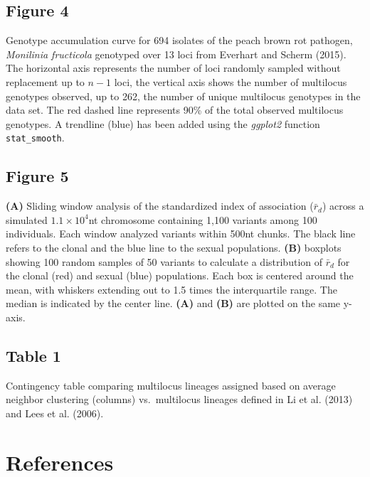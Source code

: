 \documentclass{frontiersSCNS} %
\begin{document}
\subsection*{Figure 4}\label{figure-4-1}

Genotype accumulation curve for 694 isolates of the peach brown rot
pathogen, \emph{Monilinia fructicola} genotyped over 13 loci from
Everhart and Scherm (2015). The horizontal axis represents the number of
loci randomly sampled without replacement up to \(n - 1\) loci, the
vertical axis shows the number of multilocus genotypes observed, up to
262, the number of unique multilocus genotypes in the data set. The red
dashed line represents 90\% of the total observed multilocus genotypes.
A trendline (blue) has been added using the \emph{ggplot2} function
\texttt{stat\_smooth}.

\subsection*{Figure 5}\label{figure-5-1}

\textbf{(A)} Sliding window analysis of the standardized index of
association (\(\bar{r}_d\)) across a simulated \(1.1 \times 10^4\)nt
chromosome containing 1,100 variants among 100 individuals. Each window
analyzed variants within 500nt chunks. The black line refers to the
clonal and the blue line to the sexual populations. \textbf{(B)}
boxplots showing 100 random samples of 50 variants to calculate a
distribution of \(\bar{r}_d\) for the clonal (red) and sexual (blue)
populations. Each box is centered around the mean, with whiskers
extending out to 1.5 times the interquartile range. The median is
indicated by the center line. \textbf{(A)} and \textbf{(B)} are plotted
on the same y-axis.

\subsection*{Table 1}\label{table-1-1}

Contingency table comparing multilocus lineages assigned based on
average neighbor clustering (columns) vs.~multilocus lineages defined in
Li et al. (2013) and Lees et al. (2006).

\section*{References}\label{references}
\end{document}

